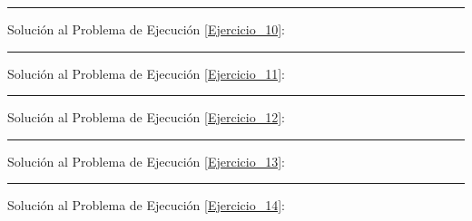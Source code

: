 \documentclass[12pt, letter]{exam}
\begin{document}
\vspace*{3.5cm}
\rule{0.9\textwidth}{0.3mm}

Solución al Problema de Ejecución \ref{Ejercicio_10}:

\vspace*{3.5cm}
\rule{0.9\textwidth}{0.3mm}

Solución al Problema de Ejecución \ref{Ejercicio_11}:

\vspace*{3.5cm}
\rule{0.9\textwidth}{0.3mm}

Solución al Problema de Ejecución \ref{Ejercicio_12}:

\vspace*{3.5cm}
\rule{0.9\textwidth}{0.3mm}

Solución al Problema de Ejecución \ref{Ejercicio_13}:

\vspace*{3.5cm}
\rule{0.9\textwidth}{0.3mm}

Solución al Problema de Ejecución \ref{Ejercicio_14}:



\end{document}
